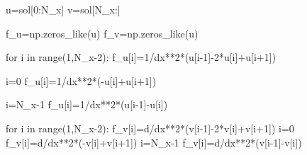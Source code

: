 \documentclass[
  letterpaper,
  DIV=11,
  numbers=noendperiod]{scrreprt}
\newenvironment{Shaded}{\begin{snugshade}}{\end{snugshade}}
\newcommand{\BuiltInTok}[1]{\textcolor[rgb]{0.00,0.23,0.31}{#1}}
\newcommand{\ControlFlowTok}[1]{\textcolor[rgb]{0.00,0.23,0.31}{#1}}
\newcommand{\DecValTok}[1]{\textcolor[rgb]{0.68,0.00,0.00}{#1}}
\newcommand{\KeywordTok}[1]{\textcolor[rgb]{0.00,0.23,0.31}{#1}}
\newcommand{\NormalTok}[1]{\textcolor[rgb]{0.00,0.23,0.31}{#1}}
\newcommand{\OperatorTok}[1]{\textcolor[rgb]{0.37,0.37,0.37}{#1}}
\theoremstyle{plain}
\theoremstyle{definition}
\theoremstyle{plain}
\theoremstyle{remark}
\begin{document}
\begin{Shaded}
\begin{Highlighting}[]
\NormalTok{    u}\OperatorTok{=}\NormalTok{sol[}\DecValTok{0}\NormalTok{:N\_x]}
\NormalTok{    v}\OperatorTok{=}\NormalTok{sol[N\_x:]}

\NormalTok{    f\_u}\OperatorTok{=}\NormalTok{np.zeros\_like(u)}
\NormalTok{    f\_v}\OperatorTok{=}\NormalTok{np.zeros\_like(u)}

    \ControlFlowTok{for}\NormalTok{ i }\KeywordTok{in} \BuiltInTok{range}\NormalTok{(}\DecValTok{1}\NormalTok{,N\_x}\OperatorTok{{-}}\DecValTok{2}\NormalTok{):}
\NormalTok{      f\_u[i]}\OperatorTok{=}\DecValTok{1}\OperatorTok{/}\NormalTok{dx}\OperatorTok{**}\DecValTok{2}\OperatorTok{*}\NormalTok{(u[i}\OperatorTok{{-}}\DecValTok{1}\NormalTok{]}\OperatorTok{{-}}\DecValTok{2}\OperatorTok{*}\NormalTok{u[i]}\OperatorTok{+}\NormalTok{u[i}\OperatorTok{+}\DecValTok{1}\NormalTok{]) }

\NormalTok{    i}\OperatorTok{=}\DecValTok{0}
\NormalTok{    f\_u[i]}\OperatorTok{=}\DecValTok{1}\OperatorTok{/}\NormalTok{dx}\OperatorTok{**}\DecValTok{2}\OperatorTok{*}\NormalTok{(}\OperatorTok{{-}}\NormalTok{u[i]}\OperatorTok{+}\NormalTok{u[i}\OperatorTok{+}\DecValTok{1}\NormalTok{])}

\NormalTok{    i}\OperatorTok{=}\NormalTok{N\_x}\OperatorTok{{-}}\DecValTok{1}
\NormalTok{    f\_u[i]}\OperatorTok{=}\DecValTok{1}\OperatorTok{/}\NormalTok{dx}\OperatorTok{**}\DecValTok{2}\OperatorTok{*}\NormalTok{(u[i}\OperatorTok{{-}}\DecValTok{1}\NormalTok{]}\OperatorTok{{-}}\NormalTok{u[i])}


    \ControlFlowTok{for}\NormalTok{ i }\KeywordTok{in} \BuiltInTok{range}\NormalTok{(}\DecValTok{1}\NormalTok{,N\_x}\OperatorTok{{-}}\DecValTok{2}\NormalTok{):}
\NormalTok{      f\_v[i]}\OperatorTok{=}\NormalTok{d}\OperatorTok{/}\NormalTok{dx}\OperatorTok{**}\DecValTok{2}\OperatorTok{*}\NormalTok{(v[i}\OperatorTok{{-}}\DecValTok{1}\NormalTok{]}\OperatorTok{{-}}\DecValTok{2}\OperatorTok{*}\NormalTok{v[i]}\OperatorTok{+}\NormalTok{v[i}\OperatorTok{+}\DecValTok{1}\NormalTok{]) }
\NormalTok{    i}\OperatorTok{=}\DecValTok{0}
\NormalTok{    f\_v[i]}\OperatorTok{=}\NormalTok{d}\OperatorTok{/}\NormalTok{dx}\OperatorTok{**}\DecValTok{2}\OperatorTok{*}\NormalTok{(}\OperatorTok{{-}}\NormalTok{v[i]}\OperatorTok{+}\NormalTok{v[i}\OperatorTok{+}\DecValTok{1}\NormalTok{]) }
\NormalTok{    i}\OperatorTok{=}\NormalTok{N\_x}\OperatorTok{{-}}\DecValTok{1}
\NormalTok{    f\_v[i]}\OperatorTok{=}\NormalTok{d}\OperatorTok{/}\NormalTok{dx}\OperatorTok{**}\DecValTok{2}\OperatorTok{*}\NormalTok{(v[i}\OperatorTok{{-}}\DecValTok{1}\NormalTok{]}\OperatorTok{{-}}\NormalTok{v[i])}


\end{Highlighting}
\end{Shaded}
\end{document}
